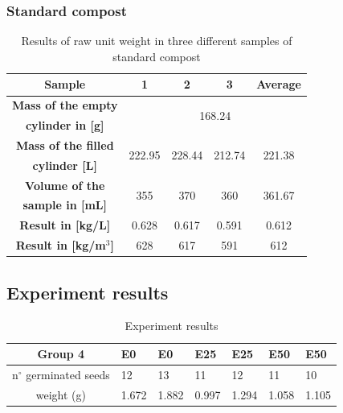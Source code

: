 \documentclass{article}
\begin{document}
\subsubsection{Standard compost}
\renewcommand{\arraystretch}{1.5}
\begin{table}[ht!]
    \centering \vspace{.3cm}
    \caption{Results of raw unit weight in three different samples of standard compost}
    \begin{tabular}{|c|c|c|c|c|}
        \hline
        \textbf{Sample} & \textbf{1} & \textbf{2} & \textbf{3} & \textbf{Average}\\
        \hline
        {\textbf{Mass of the empty}} & \multicolumn{4}{c|}{\multirow{2}{*}{168.24}}\\
        \textbf{cylinder in [g]} & \multicolumn{4}{c|}{}\\
        \hline
        \textbf{Mass of the filled} & \multirow{2}{*}{222.95} & \multirow{2}{*}{228.44} & \multirow{2}{*}{212.74} & \multirow{2}{*}{221.38}\\
        \textbf{cylinder [L]} & & & &\\
        \hline
        \textbf{Volume of the} & \multirow{2}{*}{355} & \multirow{2}{*}{370} & \multirow{2}{*}{360} & \multirow{2}{*}{361.67}\\
        \textbf{sample in [mL]} & & & &\\
        \hline
        \textbf{Result in [kg/L]} & 0.628 & 0.617 & 0.591 & 0.612\\
        \hline
        \textbf{Result in [kg/m$^3$]} & 628 & 617 & 591 & 612\\
        \hline
    \end{tabular}
\end{table}

\subsection{Experiment results}
\renewcommand{\arraystretch}{1.5}
\begin{table}[ht!]
    \centering \vspace{.3cm}
    \caption{Experiment results}
    \begin{tabular}{|c|l|l|l|l|l|l|}
        \hline
        \textbf{Group 4} & \textbf{E0} & \textbf{E0} & \textbf{E25} & \textbf{E25} & \textbf{E50} & \textbf{E50} \\
        \hline
        n$^{\circ}$ germinated seeds & 12 & 13 & 11 & 12 & 11 & 10\\
        \hline
        weight (g) & 1.672 & 1.882 & 0.997 & 1.294 & 1.058 & 1.105\\
        \hline
    \end{tabular}
\end{table}
\end{document}
